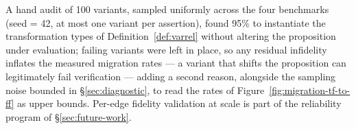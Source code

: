 A hand audit of 100 variants, sampled uniformly across the four benchmarks (seed = 42, at most one variant per assertion), found 95\% to instantiate the transformation types of Definition~\ref{def:varrel} without altering the proposition under evaluation; failing variants were left in place, so any residual infidelity inflates the measured migration rates --- a variant that shifts the proposition can legitimately fail verification --- adding a second reason, alongside the sampling noise bounded in \S\ref{sec:diagnostic}, to read the rates of Figure~\ref{fig:migration-tf-to-ff} as upper bounds. Per-edge fidelity validation at scale is part of the reliability program of \S\ref{sec:future-work}.

